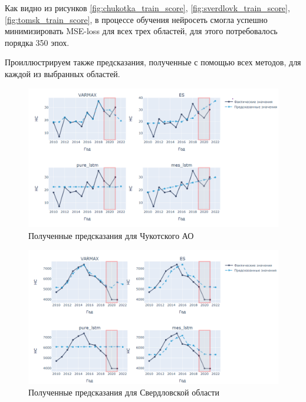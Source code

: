 Как видно из рисунков \ref{fig:chukotka_train_score}, \ref{fig:sverdlovk_train_score}, \ref{fig:tomsk_train_score}, в процессе обучения нейросеть смогла успешно минимизировать MSE-loss для всех трех областей, для этого потребовалось порядка 350 эпох.

Проиллюстрируем также предсказания, полученные с помощью всех методов, для каждой из выбранных областей.


\begin{figure}[ht]
	\centering
	\includegraphics[width=1\textwidth]{images/chukotka_predict.png}
	\caption{Полученные предсказания для Чукотского АО}
	\label{fig:chukotka_predict}
\end{figure}

\begin{figure}[ht]
	\centering
	\includegraphics[width=1\textwidth]{images/sverdlovsk_predict.png}
	\caption{Полученные предсказания для Свердловской области}
	\label{fig:sverdlovsk_predict}
\end{figure}

